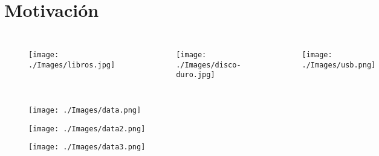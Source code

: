 
\section{Motivación}

{
	
	\begin{frame}{}			

		\kern -3mm
		\begin{columns}
			\begin{figure}[H]
				\centering
				\texttt{[image: ./Images/libros.jpg]}
			\end{figure}
			\begin{figure}[H]
				\centering
				\texttt{[image: ./Images/disco-duro.jpg]}
			\end{figure}
			\begin{figure}[H]
				\centering
				\texttt{[image: ./Images/usb.png]}
			\end{figure}
		\end{columns}

		\begin{figure}[H]
			\centering
			\texttt{[image: ./Images/data.png]}
		\end{figure}


	\end{frame}
}
			

{
		
	\begin{frame}{}

		\kern -2mm
		\begin{figure}[H]
			\centering
			\texttt{[image: ./Images/data2.png]}
		\end{figure}
		\kern -5mm
		\begin{figure}[H]
			\centering
			\texttt{[image: ./Images/data3.png]}
		\end{figure}

	\end{frame}
}

